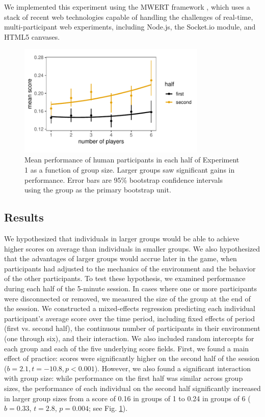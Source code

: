\documentclass[12pt,letterpaper]{article}
\newcommand{\andrew}[1]{\textcolor{magenta}{\bf [Andrew: #1]}}
\begin{document}
We implemented this experiment using the MWERT framework \cite{hawkins_conducting_2014}, which uses a stack of recent web technologies capable of handling the challenges of real-time, multi-participant web experiments, including Node.js, the Socket.io module, and HTML5 canvases.  

\begin{figure}[t!]
  \centering
  \includegraphics[width=0.8\textwidth]{./figures/performance-summary-exp1.pdf}
  \caption{Mean performance of human participants in each half of Experiment 1 as a function of group size. Larger groups saw significant gains in performance. Error bars are 95\% bootstrap confidence intervals using the group as the primary bootstrap unit. %
  }
  \label{fig:exp1_performance}
\end{figure}

\subsection{Results}

We hypothesized that individuals in larger groups would be able to achieve higher scores on average than individuals in smaller groups. 
We also hypothesized that the advantages of larger groups would accrue later in the game, when participants had adjusted to the mechanics of the environment and the behavior of the other participants.
To test these hypothesis, we examined performance during each half of the 5-minute session. 
In cases where one or more participants were disconnected or removed, we measured the size of the group at the end of the session.
We constructed a mixed-effects regression predicting each individual participant's average score over the time period, including fixed effects of period (first vs. second half), the continuous number of participants in their environment (one through six), and their interaction.
We also included random intercepts for each group and each of the five underlying score fields.
First, we found a main effect of practice: scores were significantly higher on the second half of the session ($b = 2.1,t=-10.8, p < 0.001$).
However, we also found a significant interaction with group size: while performance on the first half was similar across group sizes, the performance of each individual on the second half significantly increased in larger group sizes from a score of 0.16 in groups of 1 to 0.24 in groups of 6 ($b = 0.33$, $t = 2.8$, $p = 0.004$; see Fig. \ref{fig:exp1_performance}). 
\end{document}
